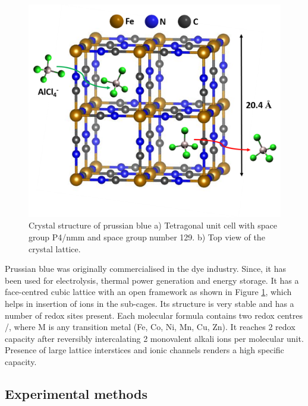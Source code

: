  \begin{figure}[tbh!]
  \centering
  \includegraphics[width=\textwidth]{Figures/chap6fig/pbcrys}
    \caption{Crystal structure of prussian blue a) Tetragonal unit cell with space group P4/nmm and space group number 129. b) Top view of the crystal lattice.}
  \label{Figures/chap6fig:pbcrys}
\end{figure}

Prussian blue was originally commercialised in the dye industry. Since, it has been used for electrolysis, thermal power generation and energy storage. It has a face-centred cubic lattice with an open framework as shown in Figure \ref{Figures/chap6fig:pbcrys}, which helps in insertion of ions in the sub-cages. Its structure is very stable and has a number of redox sites present. Each molecular formula contains two redox centres /, where M is any transition metal (Fe, Co, Ni, Mn, Cu, Zn). It reaches 2 redox capacity after reversibly intercalating 2 monovalent alkali ions per molecular unit. Presence of large lattice interstices and ionic channels renders a high specific capacity. 

\subsection{Experimental methods}
